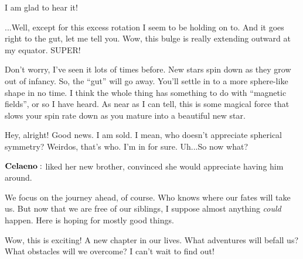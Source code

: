 \Celaeno I am glad to hear it!

\Lacedaemon ...Well, except for this excess rotation I seem to be holding on to. And it goes right to the gut, let me tell you.  Wow, this bulge is really extending outward at my equator.  SUPER!  

\Celaeno Don't worry, I've seen it lots of times before.  New stars spin down as they grow out of infancy.  So, the ``gut'' will go away.  You'll settle in to a more sphere-like shape in no time.  I think the whole thing has something to do with ``magnetic fields'', or so I have heard.  As near as I can tell, this is some magical force that slows your spin rate down as you mature into a beautiful new star.

\Lacedaemon Hey, alright!  Good news.  I am sold.  I mean, who doesn't appreciate spherical symmetry?  Weirdos, that's who.  I'm in for sure.  Uh...So now what?

$\Celaeno$ liked her new brother, convinced she would appreciate having him around.

\Celaeno We focus on the journey ahead, of course.  Who knows where our fates will take us.  But now that we are free of our siblings, I suppose almost anything \textit{could} happen.  Here is hoping for mostly good things.

\Lacedaemon  Wow, this is exciting!  A new chapter in our lives.  What adventures will befall us?  What obstacles will we overcome?  I can't wait to find out!

